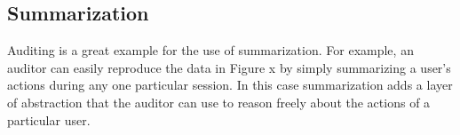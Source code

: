 \subsection{Summarization}
Auditing is a great example for the use of summarization. For example, an auditor can easily reproduce the data in Figure x by simply summarizing a user's actions during any one particular session. In this case summarization adds a layer of abstraction that the auditor can use to reason freely about the actions of a particular user.
